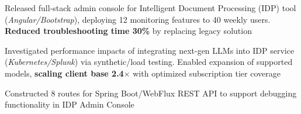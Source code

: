 \documentclass[letterpaper,11pt]{article}
\newcommand{\resumeItem}[1]{
  \item\small{
    {#1 \vspace{-1pt}}
  }
}
\begin{document}
        \resumeItem{Released full-stack admin console for Intelligent Document Processing (IDP) tool (\textit{Angular/Bootstrap}), deploying 12 monitoring features to 40 weekly users. \textbf{Reduced troubleshooting time 30\%} by replacing legacy solution}

        \resumeItem{Investigated performance impacts of integrating next-gen LLMs into IDP service (\textit{Kubernetes/Splunk}) via synthetic/load testing. Enabled expansion of supported models, \textbf{scaling client base 2.4$\times$} with optimized subscription tier coverage}
    
        
        \resumeItem{Constructed 8 routes for Spring Boot/WebFlux REST API to support debugging functionality in IDP Admin Console}

        
        
\end{document}
